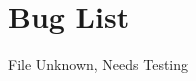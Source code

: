 \chapter{Bug List}
\hypertarget{bug}{}\label{bug}

\begin{DoxyRefList}
\item[File \doxylink{var_int_file___i_o_8h}{var\+Int\+File\+\_\+\+IO.h} ]\label{bug__bug000001}%
%
Unknown, Needs Testing 
\end{DoxyRefList}